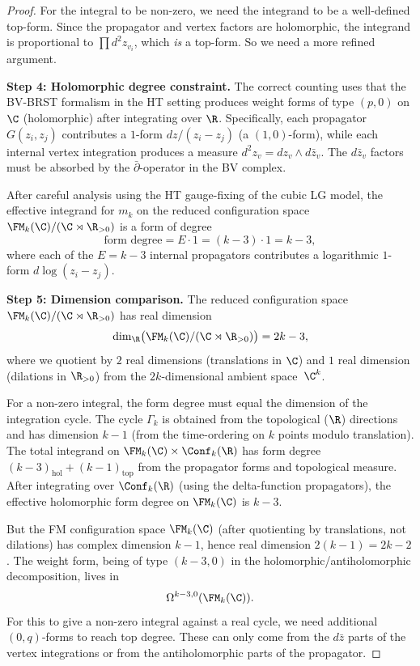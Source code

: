 \begin{proof}
For the integral to be non-zero, we need the integrand to be a well-defined top-form. Since the propagator and vertex factors are holomorphic, the integrand is proportional to $\prod d^2z_{v_i}$, which \emph{is} a top-form. So we need a more refined argument.

\textbf{Step 4: Holomorphic degree constraint.}
The correct counting uses that the BV-BRST formalism in the HT setting produces weight forms of type $(p,0)$ on $\C$ (holomorphic) after integrating over $\R$. Specifically, each propagator $G(z_i, z_j)$ contributes a $1$-form $dz/(z_i - z_j)$ (a $(1,0)$-form), while each internal vertex integration produces a measure $d^2z_v = dz_v \wedge d\bar{z}_v$. The $d\bar{z}_v$ factors must be absorbed by the $\bar{\partial}$-operator in the BV complex.

After careful analysis using the HT gauge-fixing of the cubic LG model,
the effective integrand for $m_k$ on the reduced configuration space
$\FM_k(\C)/(\C \rtimes \R_{>0})$ is a form of degree
\[
\text{form degree} = E \cdot 1 = (k-3) \cdot 1 = k - 3,
\]
where each of the $E = k-3$ internal propagators contributes a logarithmic $1$-form $d\log(z_i - z_j)$.

\textbf{Step 5: Dimension comparison.}
The reduced configuration space $\FM_k(\C)/(\C \rtimes \R_{>0})$ has real dimension
\[
\dim_{\R}\bigl(\FM_k(\C)/(\C \rtimes \R_{>0})\bigr) = 2k - 3,
\]
where we quotient by $2$ real dimensions (translations in $\C$) and $1$ real dimension (dilations in $\R_{>0}$) from the $2k$-dimensional ambient space~$\C^k$.

For a non-zero integral, the form degree must equal the dimension of the integration cycle. The cycle $\Gamma_k$ is obtained from the topological ($\R$) directions and has dimension $k-1$ (from the time-ordering on $k$ points modulo translation). The total integrand on $\FM_k(\C) \times \Conf_k(\R)$ has form degree $(k-3)_{\text{hol}} + (k-1)_{\text{top}}$ from the propagator forms and topological measure. After integrating over $\Conf_k(\R)$ (using the delta-function propagators), the effective holomorphic form degree on $\FM_k(\C)$ is $k-3$.

But the FM configuration space $\FM_k(\C)$ (after quotienting by translations, not dilations) has complex dimension $k-1$, hence real dimension $2(k-1) = 2k - 2$. The weight form, being of type $(k-3, 0)$ in the holomorphic/antiholomorphic decomposition, lives in
\[
\Omega^{k-3, 0}(\FM_k(\C)).
\]
For this to give a non-zero integral against a real cycle, we need additional $(0, q)$-forms to reach top degree. These can only come from the $d\bar{z}$ parts of the vertex integrations or from the antiholomorphic parts of the propagator.


\end{proof}
